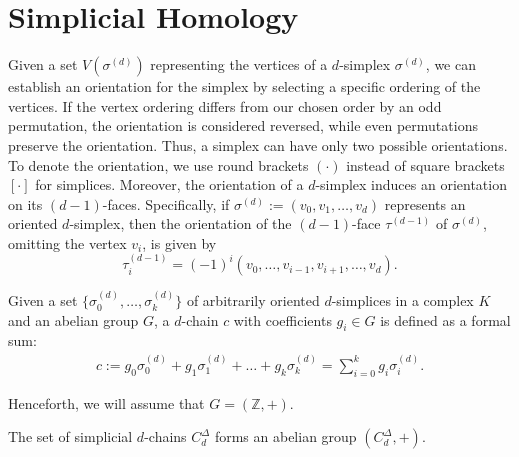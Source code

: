 \section{Simplicial Homology}
\label{SimplicialHomology}
Given a set \( V(\sigma^{(d)}) \) representing the vertices of a \( d \)-simplex
\( \sigma^{(d)} \), we can establish an orientation for the simplex by selecting a
specific ordering of the vertices. If the vertex ordering differs from our chosen
order by an odd permutation, the orientation is considered reversed, while even permutations
preserve the orientation. Thus, a simplex can have only two possible orientations. To denote the orientation, we use round brackets $(\cdot)$ instead of square brackets $[\cdot]$ for simplices.
Moreover, the orientation of a \( d \)-simplex induces an orientation on its \( (d-1) \)-faces.
Specifically, if \( \sigma^{(d)} := (v_{0}, v_{1}, \ldots, v_{d}) \) represents an oriented
\( d \)-simplex, then the orientation of the \( (d-1) \)-face \( \tau^{(d-1)} \) of
\( \sigma^{(d)} \), omitting the vertex \( v_{i} \), is given by
\begin{equation}
	\tau_{i}^{(d-1)} = (-1)^{i} (v_{0}, \ldots, v_{i-1}, v_{i+1}, \ldots, v_{d}).
\end{equation}

\begin{definition}[$d$-Chain]{\cite[\S 2.3]{zomorodian2004computing}}
	\label{d-Chain}
	Given a set \(\{\sigma_{0}^{(d)}, \ldots, \sigma_{k}^{(d)}\}\) of arbitrarily oriented \(d\)-simplices in a complex \(K\) and an abelian group \(G\), a \(d\)-chain \(c\) with coefficients \(g_{i} \in G\) is defined as a formal sum:
	\begin{align}
		c := g_{0}\sigma^{(d)}_{0} + g_{1}\sigma^{(d)}_{1} + \ldots + g_{k}\sigma^{(d)}_{k} = \sum_{i=0}^{k} g_{i}\sigma^{(d)}_{i}. 
	\end{align}
\end{definition}

Henceforth, we will assume that \( G = (\mathbb{Z}, +) \).

\begin{lemma}
	The set of simplicial \( d \)-chains \( C^{\Delta}_{d} \) forms an abelian group \( (C^{\Delta}_{d}, +) \).
\end{lemma}


